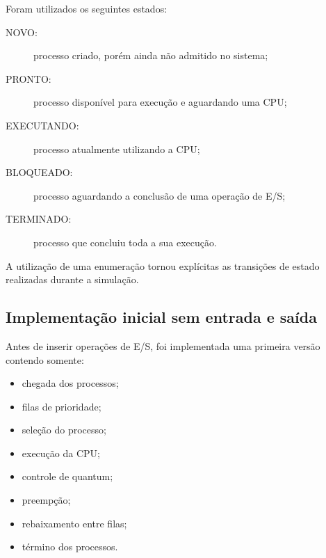 \documentclass[12pt,a4paper]{article}
\begin{document}
Foram utilizados os seguintes estados:

\begin{description}

    \item[NOVO:] processo criado, porém ainda não admitido no sistema;

    \item[PRONTO:] processo disponível para execução e aguardando uma
    CPU;

    \item[EXECUTANDO:] processo atualmente utilizando a CPU;

    \item[BLOQUEADO:] processo aguardando a conclusão de uma operação
    de E/S;

    \item[TERMINADO:] processo que concluiu toda a sua execução.

\end{description}

A utilização de uma enumeração tornou explícitas as transições de
estado realizadas durante a simulação.



\subsection{Implementação inicial sem entrada e saída}

Antes de inserir operações de E/S, foi implementada uma primeira
versão contendo somente:

\begin{itemize}

    \item chegada dos processos;

    \item filas de prioridade;

    \item seleção do processo;

    \item execução da CPU;

    \item controle de quantum;

    \item preempção;

    \item rebaixamento entre filas;

    \item término dos processos.

\end{itemize}
\end{document}
